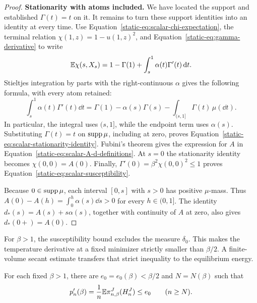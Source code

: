 \begin{proof}
\par\medskip\noindent\textbf{Stationarity with atoms included.}\enspace
We have located the support and established $\Gamma(t)=t$ on it.
It remains to turn these support identities into an identity at every
time. Use Equation~\eqref{static-eq:scalar-chi-expectation}, the
terminal relation $\chi(1,z)=1-u(1,z)^2$, and
Equation~\eqref{static-eq:gamma-derivative} to write
\[
 \mathbb E\chi(s,X_s)=1-\Gamma(1)+\int_s^1\alpha(t)\Gamma'(t)\,\mathrm d t.
\]
Stieltjes integration by parts with the right-continuous
$\alpha$ gives the following formula, with every atom retained:
\[
 \int_s^1\alpha(t)\Gamma'(t)\dd t
 =\Gamma(1)-\alpha(s)\Gamma(s)
     -\int_{(s,1]}\Gamma(t)\,\mu(\dd t).
\]
In particular, the integral uses $(s,1]$, while the endpoint term
uses $\alpha(s)$. Substituting $\Gamma(t)=t$ on $\operatorname{supp}\mu$,
including at zero, proves
Equation~\eqref{static-eq:scalar-stationarity-identity}. Fubini's
theorem gives the expression for $A$ in
Equation~\eqref{static-eq:scalar-A-d-definitions}. At $s=0$ the
stationarity identity becomes $\chi(0,0)=A(0)$. Finally,
$\Gamma'(0)=\beta^2\chi(0,0)^2\le1$ proves
Equation~\eqref{static-eq:scalar-susceptibility}.

Because $0\in\operatorname{supp}\mu$, each interval $[0,s]$ with $s>0$
has positive $\mu$-mass. Thus
$A(0)-A(h)=\int_0^h\alpha(s)\dd s>0$ for every $h\in(0,1]$.
The identity $d_*(s)=A(s)+s\alpha(s)$, together with continuity
of $A$ at zero, also gives $d_*(0+)=A(0)$.
\end{proof}

For $\beta>1$, the susceptibility bound excludes the measure
$\delta_0$. This makes the temperature derivative at a fixed
minimizer strictly smaller than $\beta/2$. A finite-volume secant
estimate transfers that strict inequality to the equilibrium energy.

\begin{lemma}\label{static-lem:energy-gap}
For each fixed $\beta>1$, there are $e_0=e_0(\beta)<\beta/2$ and
$N=N(\beta)$ such that
\begin{equation}\label{static-eq:energy-gap}
 p_n'(\beta)=\frac1n\mathbb E\pi_{n,\beta}^J(H_n^J)\le e_0
 \qquad(n\ge N).
\end{equation}
\end{lemma}

